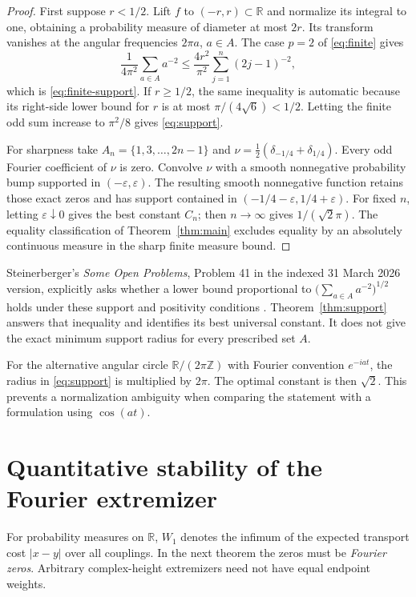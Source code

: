 \documentclass[11pt]{article}
\theoremstyle{remark}\newtheorem{remark}[theorem]{Remark}
\newcommand{\R}{\mathbb R}
\newcommand{\Z}{\mathbb Z}
\begin{document}
\begin{proof}
First suppose $r<1/2$. Lift $f$ to $(-r,r)\subset\R$ and normalize its integral
to one, obtaining a probability measure of diameter at most $2r$.
Its transform vanishes at the angular frequencies $2\pi a$, $a\in A$.
The case $p=2$ of \eqref{eq:finite} gives
\[
 \frac1{4\pi^2}\sum_{a\in A}a^{-2}
 \le\frac{4r^2}{\pi^2}\sum_{j=1}^n(2j-1)^{-2},
\]
which is \eqref{eq:finite-support}. If $r\ge1/2$, the same inequality is
automatic because its right-side lower bound for $r$ is at most
$\pi/(4\sqrt6)<1/2$. Letting the finite odd sum increase to $\pi^2/8$ gives
\eqref{eq:support}.

For sharpness take $A_n=\{1,3,\ldots,2n-1\}$ and
$\nu=\tfrac12(\delta_{-1/4}+\delta_{1/4})$. Every odd Fourier coefficient of
$\nu$ is zero. Convolve $\nu$ with a smooth nonnegative probability bump supported
in $(-\varepsilon,\varepsilon)$. The resulting smooth nonnegative function
retains those exact zeros and has support contained in
$(-1/4-\varepsilon,1/4+\varepsilon)$. For fixed $n$, letting
$\varepsilon\downarrow0$ gives the best constant $C_n$; then $n\to\infty$
gives $1/(\sqrt2\pi)$. The equality classification of Theorem~\ref{thm:main}
excludes equality by an absolutely continuous measure in the sharp finite
measure bound.
\end{proof}

Steinerberger's \emph{Some Open Problems}, Problem 41 in the indexed
31 March 2026 version, explicitly asks whether a lower bound proportional to
$\bigl(\sum_{a\in A}a^{-2}\bigr)^{1/2}$ holds under these support and positivity
conditions \cite{Steinerberger}. Theorem~\ref{thm:support} answers that inequality
and identifies its best universal constant. It does not give the exact minimum
support radius for every prescribed set $A$.

For the alternative angular circle $\R/(2\pi\Z)$ with Fourier convention
$e^{-iat}$, the radius in \eqref{eq:support} is multiplied by $2\pi$.
The optimal constant is then $\sqrt2$. This prevents a normalization ambiguity
when comparing the statement with a formulation using $\cos(at)$.

\section{Quantitative stability of the Fourier extremizer}

For probability measures on $\R$, $W_1$ denotes the infimum of the expected
transport cost $|x-y|$ over all couplings. In the next theorem the zeros must be
\emph{Fourier zeros}. Arbitrary complex-height extremizers need not have equal
endpoint weights.
\end{document}
